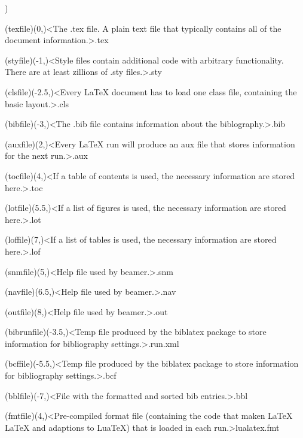 ){
	\tonode[\necessary](texfile)(0,\layer)<The .tex file. A plain text file that typically contains all of the document information.>{.tex}

	\steplayer
	\tonode[\necessary](styfile)(-1,\layer)<Style files contain additional code with arbitrary functionality. There are at least zillions of .sty files.>{.sty}

	\tonode[\necessary](clsfile)(-2.5,\layer)<Every LaTeX document has to load one class file, containing the basic layout.>{.cls}

	\steplayer

	\tonode[\necessary](bibfile)(-3,\layer)<The .bib file contains information about the biblography.>{.bib}

	\tonode[\additional](auxfile)(2,\layer)<Every LaTeX run will produce an aux file that stores information for the next run.>{.aux}

	\tonode[\additional](tocfile)(4,\layer)<If a table of contents is used, the necessary information are stored here.>{.toc}

	\tonode[\additional](lotfile)(5.5,\layer)<If a list of figures is used, the necessary information are stored here.>{.lot}

	\tonode[\additional](loffile)(7,\layer)<If a list of tables is used, the necessary information are stored here.>{.lof}

	\steplayer

	\tonode[\additional](snmfile)(5,\layer)<Help file used by beamer.>{.snm}

	\tonode[\additional](navfile)(6.5,\layer)<Help file used by beamer.>{.nav}

	\tonode[\additional](outfile)(8,\layer)<Help file used by beamer.>{.out}

	\steplayer
	\tonode[\additional](bibrunfile)(-3.5,\layer)<Temp file produced by the biblatex package to store information for bibliography settings.>{.run.xml}

	\tonode[\additional](bcffile)(-5.5,\layer)<Temp file produced by the biblatex package to store information for bibliography settings.>{.bcf}

	\tonode[\additional](bblfile)(-7,\layer)<File with the formatted and sorted bib entries.>{.bbl}

	\steplayer[-2]

	\tonode[\necessary](fmtfile)(4,\layer)<Pre-compiled format file (containing the code that maken LaTeX LaTeX and adaptions to LuaTeX) that is loaded in each run.>{lualatex.fmt}

}
